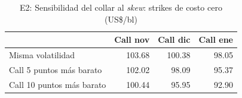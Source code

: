 \begin{table}[htbp]\centering\small
\caption{E2: Sensibilidad del collar al \emph{skew}: strikes de costo cero (US\$/bl)}\label{tab:skew}
\begin{tabular}{lrrr}
\toprule
 & \textbf{Call nov} & \textbf{Call dic} & \textbf{Call ene} \\
\midrule
Misma volatilidad & 103.68 & 100.38 & 98.05 \\
Call 5 puntos más barato & 102.02 & 98.09 & 95.37 \\
Call 10 puntos más barato & 100.44 & 95.95 & 92.90 \\
\bottomrule
\end{tabular}
\end{table}
